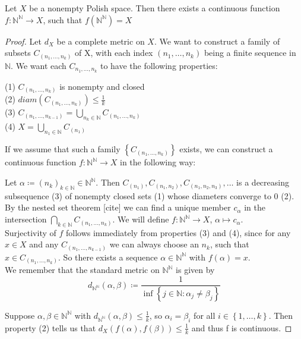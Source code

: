 \documentclass[10pt, a4paper, titlepage]{article}
\numberwithin{equation}{section}
\begin{document}
\begin{theorem}
	Let $X$ be a nonempty Polish space. Then there exists a continuous function $f: \mathbb{N}^\mathbb{N} \to X $, such that $f\left( \mathbb{N}^\mathbb{N} \right) = X$
\end{theorem}
\begin{proof}
Let $d_X$ be a complete metric on $X$. We want to construct a family of subsets $C_{(n_1,\ldots,n_k)}$ of X, 
with each index $\left( n_1,\ldots,n_k \right) $ being a finite sequence in $\mathbb{N}$.	
We want each  $C_{n_1,\ldots,n_k}$ to have the following properties:

(1) $C_{\left( n_1,\ldots,n_k \right) }$ is nonempty and closed\\
(2) $diam \left( C_{\left( n_1,\ldots,n_k \right) } \right) \leq \frac{1}{k}$\\
(3) $C_{\left( n_1,\ldots,n_{k-1} \right) } = \bigcup_{n_k \in \mathbb{N}} C_{\left( n_1,\ldots,n_k \right) }$ \\
(4) $X = \bigcup_{n_1 \in \mathbb{N}} C_{\left( n_1 \right) }$

If we assume that such a family $\left\{ C_{\left( n_1,\ldots,n_k \right) }  \right\} $ exists, we can construct a continuous function $f: \mathbb{N}^\mathbb{N} \to X$ in the following way:

Let $\alpha \coloneq \left( n_k \right)_{k \in \mathbb{N}} \in \mathbb{N}^{\mathbb{N}}$.
Then $C_{\left( n_1 \right) }, C_{\left( n_1,n_2 \right) },C_{\left( n_1,n_2,n_3 \right) },\ldots$ is a decreasing subsequence (3) of nonempty closed sets (1) whose diameters converge to 0 (2).
By the nested set theorem [cite] we can find a unique member $c_\alpha$ in the intersection $\bigcap_{k \in \mathbb{N}} C_{\left( n_1,\ldots,n_k \right) }$.
We will define $f: \mathbb{N}^\mathbb{N} \to X$, $ \alpha \mapsto c_{\alpha}$.\\
Surjectivity of $f$ follows immediately from properties  (3) and (4), since for any $ x \in X$ and any $C_{\left( n_1,\ldots,n_{k-1} \right) }$ we can always choose an $n_k$, such that  $x \in C_{\left( n_1,\ldots,n_k \right) }$. 
So there exists a sequence $\alpha \in \mathbb{N}^\mathbb{N}$ with $f(\alpha) = x$.\\
We remember that the standard metric on $\mathbb{N}^\mathbb{N}$ is given by 
\[d_{\mathbb{N}^\mathbb{N}} \left( \alpha, \beta \right) \coloneq \frac{1}{\inf\left\{ j \in \mathbb{N}: \alpha_j \neq \beta_j \right\} }\]

Suppose $\alpha,\beta \in  \mathbb{N}^\mathbb{N}$ with $d_{\mathbb{N}^\mathbb{N}}\left( \alpha,\beta \right) \leq \frac{1}{k} $, so $\alpha_i = \beta_i$ for all  $i \in \left\{ 1,\ldots,k \right\} $.
Then property (2) tells us that $d_X\left( f\left( \alpha \right), f\left( \beta \right)  \right) \leq \frac{1}{k}$ and thus f is continuous. 


\end{proof}
\end{document}
